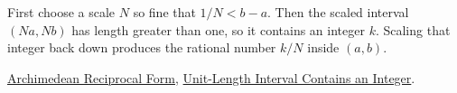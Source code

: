 \begin{remark*}
First choose a scale $N$ so fine that $1/N<b-a$. Then the scaled interval
$(Na,Nb)$ has length greater than one, so it contains an integer $k$. Scaling
that integer back down produces the rational number $k/N$ inside $(a,b)$.
\end{remark*}

\begin{dependencies}
\hyperref[cor:archimedean-reciprocal-form]{Archimedean Reciprocal Form},
\hyperref[lem:unit-length-interval-contains-integer]{Unit-Length Interval Contains an Integer}.
\end{dependencies}

\clearpage
